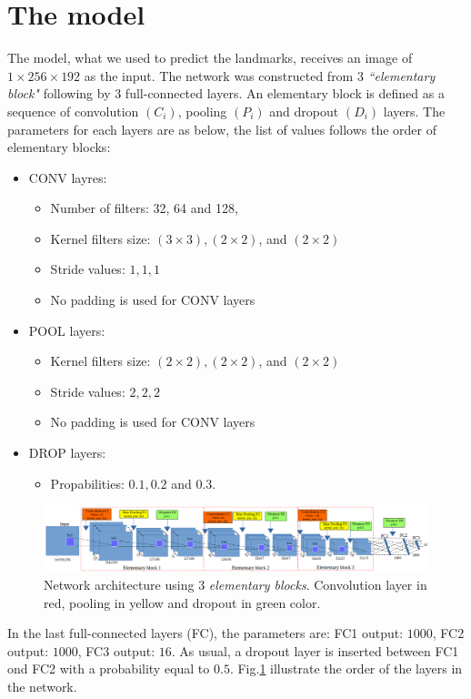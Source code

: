 \documentclass[12pt,a4paper]{article}
\begin{document}
\section{The model}
The model, what we used to predict the landmarks, receives an image of $1 \times 256 \times 192$ as the input. The network was constructed from $3$ \textit{``elementary block"} following by $3$ full-connected layers. An elementary block is defined as a sequence of convolution $(C_i)$, pooling $(P_i)$ and dropout $(D_i)$ layers. The parameters for each layers are as below, the list of values follows the order of elementary blocks:
\begin{itemize}[nosep,label=\footnotesize$\bullet$]
	\item CONV layres:
	\begin{itemize}[nosep]
		\item Number of filters: 32, 64 and 128,
		\item Kernel filters size: $(3 \times 3), (2 \times 2)$, and $(2 \times 2)$
		\item Stride values: $1,1,1$
		\item No padding is used for CONV layers
	\end{itemize}
	\item POOL layers:
	\begin{itemize}[nosep]
		\item Kernel filters size: $(2 \times 2), (2 \times 2)$, and $(2 \times 2)$
		\item Stride values: $2,2,2$
		\item No padding is used for CONV layers
	\end{itemize}
	\item DROP layers:
	\begin{itemize}
		\item Propabilities: $0.1, 0.2$ and $0.3$.
	\end{itemize}
\end{itemize}

\begin{figure}[h]
\centering
\includegraphics[scale=0.32]{images/cnn_newdatasize/arch_model}
\caption{{\small{Network architecture using $3$ \textit{elementary blocks}.
  Convolution
  layer in red, pooling in yellow and dropout in green color.}}} 
\label{cnnnetwork2}
\end{figure}
In the last full-connected layers (FC), the parameters are: FC1
output: $1000$, FC2 output: $1000$, FC3 output: $16$. As usual, a
dropout layer is inserted between FC1 ond FC2 with a probability equal to $0.5$. Fig.\ref{cnnnetwork2} illustrate the order of the layers in the network.
\end{document}
